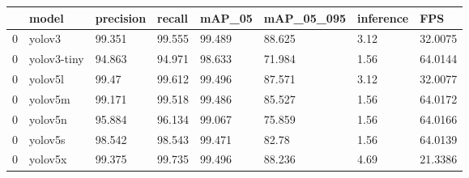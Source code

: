 \begin{tabular}{llllllll}
\toprule
{} &        model & precision &  recall &  mAP\_05 & mAP\_05\_095 & inference &      FPS \\
\midrule
0 &       yolov3 &    99.351 &  99.555 &  99.489 &     88.625 &      3.12 &  32.0075 \\
0 &  yolov3-tiny &    94.863 &  94.971 &  98.633 &     71.984 &      1.56 &  64.0144 \\
0 &      yolov5l &     99.47 &  99.612 &  99.496 &     87.571 &      3.12 &  32.0077 \\
0 &      yolov5m &    99.171 &  99.518 &  99.486 &     85.527 &      1.56 &  64.0172 \\
0 &      yolov5n &    95.884 &  96.134 &  99.067 &     75.859 &      1.56 &  64.0166 \\
0 &      yolov5s &    98.542 &  98.543 &  99.471 &      82.78 &      1.56 &  64.0139 \\
0 &      yolov5x &    99.375 &  99.735 &  99.496 &     88.236 &      4.69 &  21.3386 \\
\bottomrule
\end{tabular}
